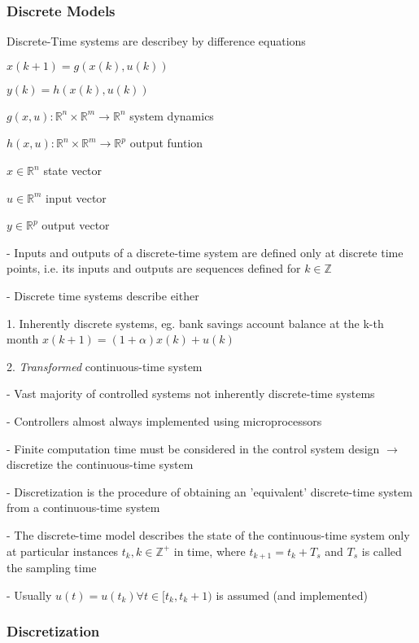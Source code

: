 \subsubsection{Discrete Models}

Discrete-Time systems are describey by difference equations

$x(k+1) = g(x(k),u(k))$

$y(k) = h(x(k),u(k))$

$g(x,u): \mathbb{R}^n \times \mathbb{R}^m \to \mathbb{R}^n$
system dynamics

$h(x,u): \mathbb{R}^n \times \mathbb{R}^m \to \mathbb{R}^p$
output funtion

$x \in \mathbb{R}^n$
state vector

$u \in \mathbb{R}^m$
input vector

$y \in \mathbb{R}^p$
output vector

- Inputs and outputs of a discrete-time system are defined only at discrete time points,
i.e. its inputs and outputs are sequences defined for $k\in\mathbb{Z}$

- Discrete time systems describe either

1. Inherently discrete systems,
eg. bank savings account balance at the k-th month
$x(k + 1) = (1 + \alpha)x(k) + u(k)$

2. \textit{Transformed} continuous-time system

- Vast majority of controlled systems not inherently discrete-time systems

- Controllers almost always implemented using microprocessors

- Finite computation time must be considered in the control system design
$\rightarrow$ discretize the continuous-time system

- Discretization is the procedure of obtaining an ’equivalent’ discrete-time
system from a continuous-time system

- The discrete-time model describes the state of the continuous-time
system only at particular instances $t_k, k\in\mathbb{Z^+}$ in time, where
$t_{k+1} = t_k + T_s$ and $T_s$ is called the sampling time

- Usually $u(t) = u(t_k) \forall t \in [t_k,t_k+1)$ is assumed (and implemented)

\subsubsection{Discretization}



